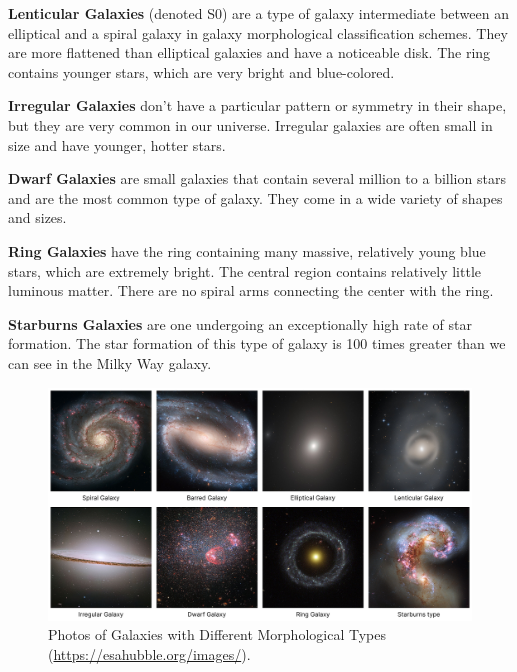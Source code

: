 \medskip

\textbf{Lenticular Galaxies} (denoted S0) are a type of galaxy intermediate between an elliptical and a spiral galaxy in galaxy morphological classification schemes. They are more flattened than elliptical galaxies and have a noticeable disk. The ring contains younger stars, which are very bright and blue-colored.

\medskip

\textbf{Irregular Galaxies} don’t have a particular pattern or symmetry in their shape, but they are very common in our universe. Irregular galaxies are often small in size and have younger, hotter stars.

\medskip

\textbf{Dwarf Galaxies} are small galaxies that contain several million to a billion stars and are the most common type of galaxy. They come in a wide variety of shapes and sizes.

\medskip

\textbf{Ring Galaxies} have the ring containing many massive, relatively young blue stars, which are extremely bright. The central region contains relatively little luminous matter. There are no spiral arms connecting the center with the ring.

\medskip

\textbf{Starburns Galaxies} are one undergoing an exceptionally high rate of star formation. The star formation of this type of galaxy is 100 times greater than we can see in the Milky Way galaxy.

\begin{figure}[htbp]
    \centering
    \includegraphics[width=\textwidth]{obrazky-figures/02-theoretical-basis/galaxies-types.png}
    \caption{Photos of Galaxies with Different Morphological Types (\url{https://esahubble.org/images/}).}
\end{figure}

